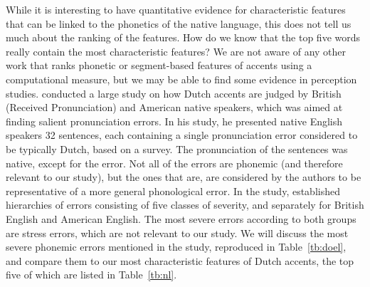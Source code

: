 \documentclass[output=paper]{LSP/langsci}
\begin{document}
While it is interesting to have quantitative evidence for characteristic features that can be linked to the phonetics of the native language, this does not tell us much about the ranking of the features. How do we know that the top five words really contain the most characteristic features? We are not aware of any other work that ranks phonetic or segment-based features of accents using a computational measure, but we may be able to find some evidence in perception studies. \citet{van_den_doel_evaluation_2006} conducted a large study on how Dutch accents are judged by British (Received Pronunciation) and American native speakers, which was aimed at finding salient pronunciation errors. In his study, he presented native English speakers 32 sentences, each containing a single pronunciation error considered to be typically Dutch, based on a survey. The pronunciation of the sentences was native, except for the error. Not all of the errors are phonemic (and therefore relevant to our study), but the ones that are, are considered by the authors to be representative of a more general phonological error. In the study, \citet[p. 292]{van_den_doel_evaluation_2006} established hierarchies of errors consisting of five classes of severity, and separately for British English and American English. The most severe errors according to both groups are stress errors, which are not relevant to our study. We will discuss the most severe phonemic errors mentioned in the study, reproduced in Table~\ref{tb:doel}, and compare them to our most characteristic features of Dutch accents, the top five of which are listed in Table~\ref{tb:nl}.
\end{document}
